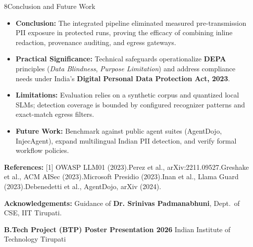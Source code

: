 \documentclass{article}
\newcommand{\affilsize}{\fontsize{18}{23}\selectfont}
\newcommand{\subhead}[1]{{\color{iitmaroon}\bfseries #1}}
\begin{document}
\hfill
\begin{minipage}[t]{0.488\textwidth}\vspace{0pt}
\begin{posterblock}[equal height group=rowC]{8}{Conclusion and Future Work}
{\fontsize{18}{26.5}\selectfont
\begin{itemize}
  \setlength{\itemsep}{0.35em}\setlength{\parskip}{0.12em}
  \item \textbf{Conclusion:} The integrated pipeline eliminated measured pre-transmission PII exposure in protected runs, proving the efficacy of combining inline redaction, provenance auditing, and egress gateways.

  \item \textbf{Practical Significance:} Technical safeguards operationalize \textbf{DEPA} principles (\textit{Data Blindness}, \textit{Purpose Limitation}) and address compliance needs under India's \textbf{Digital Personal Data Protection Act, 2023}.

  \item \textbf{Limitations:} Evaluation relies on a synthetic corpus and quantized local SLMs; detection coverage is bounded by configured recognizer patterns and exact-match egress filters.

  \item \textbf{Future Work:} Benchmark against public agent suites (AgentDojo, InjecAgent), expand multilingual Indian PII detection, and verify formal workflow policies.
\end{itemize}\par}

\vspace{0.6em}
{\fontsize{15}{19.5}\selectfont
\subhead{References:}
[1] OWASP LLM01 (2023).\quad [2] Perez et al., arXiv:2211.09527.\quad [3] Greshake et al., ACM AISec (2023).\quad [4] Microsoft Presidio (2023).\quad [6] Inan et al., Llama Guard (2023).\quad [8] Debenedetti et al., AgentDojo, arXiv (2024). \par
\vspace{0.35em}
\subhead{Acknowledgements:} Guidance of \textbf{Dr. Srinivas Padmanabhuni}, Dept.\ of CSE, IIT Tirupati.\par}
\end{posterblock}
\end{minipage}
\vfill
\begin{tcolorbox}[enhanced, colback=iitmaroon, colframe=iitmaroon, arc=0pt,
  boxrule=0pt, left=14pt, right=14pt, top=5pt, bottom=5pt,
  fontupper=\affilsize\color{white}]
\textbf{B.Tech Project (BTP) Poster Presentation 2026} \hfill
\hfill
Indian Institute of Technology Tirupati
\end{tcolorbox}
\end{document}
